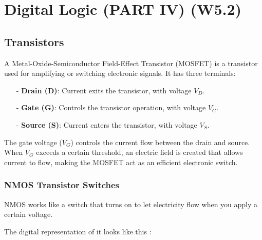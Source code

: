 \documentclass[12pt,openany]{book}
\begin{document}
			      	\chapter{Digital Logic (PART IV) (W5.2)}
			      	
				
			      	\section{Transistors}
			      	A Metal-Oxide-Semiconductor Field-Effect Transistor (MOSFET) is a transistor used for amplifying or switching electronic signals. It has three terminals:
			      	
			      	\begin{itemize}
			      		\item[-] \textbf{Drain (D)}: Current exits the transistor, with voltage \( V_D\).
			      		\item[-] \textbf{Gate (G)}: Controls the transistor operation, with voltage \( V_G\).
			      		\item[-] \textbf{Source (S)}: Current enters the transistor, with voltage \( V_S\).
			      	\end{itemize}
			      	
			      	
			      	
			      	The gate voltage (\( V_G \)) controls the current flow between the drain and source. When \( V_G \) exceeds a certain threshold, an electric field is created that allows current to flow, making the MOSFET act as an efficient electronic switch.
			     \newpage
					\subsection{NMOS Transistor Switches}
			      	\small NMOS works like a switch that turns on to let electricity flow when you apply a certain voltage.
			      	
			      	The digital representation of it looks like this :
			      	
\end{document}
